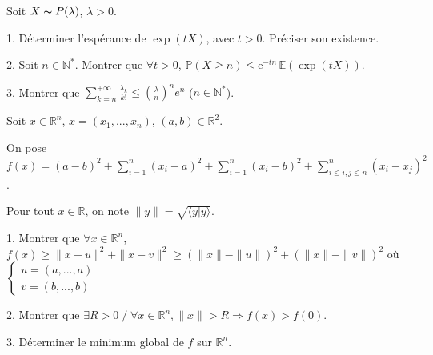 \subetoiles
\columnbreak



\noindent Soit $X \thicksim P(\lambda)$, $\lambda > 0$.

\vspace{5pt}
1. Déterminer l'espérance de $\exp(tX)$, avec $t > 0$. Préciser son existence.

\vspace{5pt}
2. Soit $n \in \mathbb{N}^*$. Montrer que $\forall t > 0$, $\mathbb{P}(X \geqslant n) \leqslant \mathrm{e}^{-tn}\,\mathbb{E}(\exp(tX))$.

\vspace{5pt}
3. Montrer que $\displaystyle \sum_{k = n}^{+\infty} \frac {\lambda_k} {k!} \leqslant \left( \frac {\lambda} {n} \right)^ne^n$ ($n \in \mathbb{N}^*$).



\subetoiles



\noindent Soit $x \in \mathbb{R}^n$, $x = (x_1, ..., x_n)$, $(a,b) \in \mathbb{R}^2$.

\noindent On pose $\displaystyle f(x) = (a-b)^2 + \sum_{i=1}^{n}(x_i-a)^2 + \sum_{i=1}^{n}(x_i-b)^2 + \sum_{i \leqslant i,j \leqslant n}^{n}(x_i-x_j)^2$.

\noindent Pour tout $x \in \mathbb{R}$, on note $\displaystyle \|y\| = \sqrt{\langle y|y \rangle}$.

\vspace{10pt}
1. Montrer que $\forall x \in \mathbb{R}^n$, $\displaystyle f(x) \geqslant \|x-u\|^2 +  \|x-v\|^2 \geqslant (\|x\| - \|u\|)^2 + (\|x\| - \|v\|)^2$
où $
\begin{cases}
  u = (a, ..., a) & \\    
  v = (b, ..., b) &
\end{cases}$

\vspace{5pt}
2. Montrer que $\exists R > 0 \;/\; \forall x \in \mathbb{R}^n, \|x\| > R \Rightarrow f(x) > f(0)$.

\vspace{5pt}
3. Déterminer le minimum global de $f$ sur $\mathbb{R}^n$.